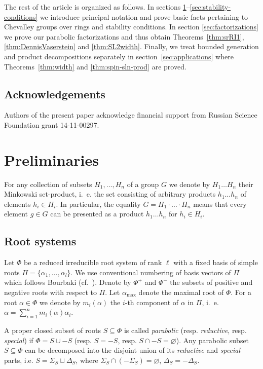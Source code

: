 \documentclass[12pt]{amsart}
\theoremstyle{plain}
\numberwithin{equation}{section}
\numberwithin{lemma}{section}
\theoremstyle{definition}
\theoremstyle{remark}
\begin{document}
The rest of the article is organized as follows.
In sections \ref{sec:prelim}--\ref{sec:stability-conditions} we introduce principal notation and prove basic facts pertaining to Chevalley groups over rings and stability conditions.
In section \ref{sec:factorizations} we prove our parabolic factorizations and thus obtain Theorems~\ref{thm:srRI1}, \ref{thm:DennisVaserstein} and \ref{thm:SL2width}.
Finally, we treat bounded generation and product decompositions separately in section~\ref{sec:applications} where Theorems~\ref{thm:width} and \ref{thm:spin-sln-prod} are proved.

\subsection{Acknowledgements}
Authors of the present paper acknowledge financial support from Russian Science Foundation grant 14-11-00297.

\section{Preliminaries}\label{sec:prelim}
For any collection of subsets $H_1, \ldots, H_n$ of a group $G$ we denote by $H_1\ldots H_n$ their Minkowski set-product, 
i.\, e. the set consisting of arbitrary products $h_1\ldots h_n$ of elements $h_i\in H_i$. In particular, the equality
$G = H_1\cdot\ldots\cdot H_n$ means that every element $g\in G$ can be presented as a product $h_1\ldots h_n$ for $h_i\in H_i$.

\subsection{Root systems}\label{sec:rootsys}
Let $\Phi$ be a reduced irreducible root system of rank $\ell$ with a fixed basis of simple roots $\Pi=\{\alpha_1, \ldots, \alpha_l\}$.
We use conventional numbering of basis vectors of $\Pi$ which follows Bourbaki (cf.~\cite[Table~1]{PSV98}).
Denote by $\Phi^+$ and $\Phi^-$ the subsets of positive and negative roots with respect to $\Pi$.
Let $\alpha_\mathrm{max}$ denote the maximal root of $\Phi$.
For a root $\alpha\in\Phi$ we denote by $m_i(\alpha)$ the $i$-th component of $\alpha$ in $\Pi$, i.\, e. $\alpha = \sum_{i=1}^n m_i(\alpha) \alpha_i$.

A proper closed subset of roots $S\subseteq \Phi$ is called {\it parabolic} (resp. {\it reductive}, resp. {\it special}) if $\Phi=S \cup -S$ (resp. $S = -S$, resp. $S \cap -S=\varnothing$).
Any parabolic subset $S \subseteq \Phi$ can be decomposed into the disjoint union of its \emph{reductive} and \emph{special} parts, i.e. 
$S = \Sigma_S \sqcup \Delta_S$, where $\Sigma_S \cap (-\Sigma_S) = \varnothing$, $\Delta_S = -\Delta_S$.
\end{document}
